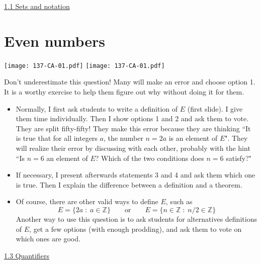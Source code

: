 \documentclass[11pt]{article}
\newcommand{\n}{\newpage}
\newcommand{\Z}{\mathbb{Z}}
\newcommand{\nl}{\hfill \vspace{-1.1\baselineskip}} %
\newcommand{\vone}{\hspace{8mm} \href{https://www.youtube.com/watch?v=4ca1t9noMlo&list=PLlwePzQY_wW-CPzhk-af-MXj9knthD1gx&index=1}{1.1 Sets and notation}}
\newcommand{\vthree}{\hspace{8mm}\href{https://www.youtube.com/watch?v=XHapWWI_wJ8&list=PLlwePzQY_wW-CPzhk-af-MXj9knthD1gx&index=3}{1.3 Quantifiers}}
\begin{document}
\begin{videos}
\vone
\end{videos}


\n
\newpage
\section{Even numbers} 

\begin{center}
{ \texttt{[image: 137-CA-01.pdf]}}
\quad
{ \texttt{[image: 137-CA-01.pdf]}}
\end{center}

\begin{warning}
Don't underestimate this question!  Many will make an error and choose option 1.  It is a worthy exercise to help them figure out why without doing it for them.
\end{warning}

\begin{comments}
\nl
\begin{itemize}
	\item  Normally, I first ask students to write a definition of $E$ (first slide).  I give them time individually.  Then I show options 1 and 2 and ask them to vote.  They are split fifty-fifty!    They make this error because they are thinking ``It is true that for all integers $a$, the number $n=2a$ is an element of $E$".  They will realize their error by discussing with each other, probably with the hint ``Is $n=6$ an element of $E$?  Which of the two conditions does $n=6$ satisfy?"
	\item If necessary, I present afterwards statements 3 and 4 and ask them which one is true.  Then I explain the difference between a definition and a theorem.
	\item Of course, there are other valid ways to define $E$, such as 
		 $$E = \{ 2a \; : \; a \in \Z\} \quad \quad \mbox{or} \quad \quad E = \{ n \in \Z \; : \; n/2 \in \Z \} $$
		Another way to use this question is to ask students for alternatives definitions of $E$, get a few options (with enough prodding), and ask them to vote on which ones are good.
\end{itemize}
\end{comments} 

\begin{videos}

\vthree

\end{videos}
\end{document}
